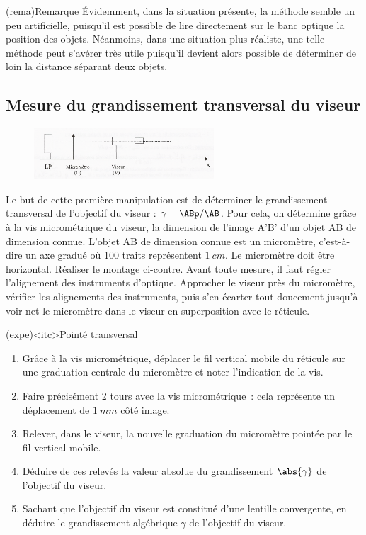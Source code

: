 \documentclass[../main/main.tex]{subfiles}
\begin{document}
\begin{tcb}[width=\linewidth](rema){Remarque} Évidemment, dans la situation
	présente, la méthode semble un peu artificielle, puisqu'il est possible de
	lire directement sur le banc optique la position des objets. Néanmoins, dans
	une situation plus réaliste, une telle méthode peut s'avérer très utile
	puisqu'il devient alors possible de déterminer de loin la distance séparant
	deux objets.
\end{tcb}

\subsection{Mesure du grandissement transversal du viseur}

\begin{figure}
	\begin{center}
		\includegraphics[width=0.6\textwidth]{PointeTransversal}
	\end{center}
\end{figure}

Le but de cette première manipulation est de déterminer le grandissement
transversal de l'objectif du viseur : $\gamma = \ABp/\AB$. Pour
cela, on détermine grâce à la vis micrométrique du viseur, la dimension de
l'image A'B' d'un objet AB de dimension connue. L'objet AB de dimension
connue est un micromètre, c'est-à-dire un axe gradué où 100 traits
représentent $\SI{1}{cm}$. Le micromètre doit être horizontal. Réaliser le
montage ci-contre. Avant toute mesure, il faut régler l'alignement des
instruments d'optique.
\bigbreak
Approcher le viseur près du micromètre, vérifier les alignements des
instruments, puis s'en écarter tout doucement jusqu'à voir net le micromètre
dans le viseur en superposition avec le réticule.

\begin{tcb}(expe)<itc>{Pointé transversal}
	\begin{enumerate}
		\item Grâce à la vis micrométrique, déplacer le fil vertical mobile du
		      réticule sur une graduation centrale du micromètre et noter
		      l'indication de la vis.
		\item Faire précisément 2 tours avec la vis micrométrique~: cela représente
		      un déplacement de $\SI{1}{mm}$ côté image.
		\item Relever, dans le viseur, la nouvelle graduation du micromètre pointée
		      par le fil vertical mobile.
		\item Déduire de ces relevés la valeur absolue du grandissement
		      $\abs{\gamma}$ de l'objectif du viseur.
		\item Sachant que l'objectif du viseur est constitué d'une lentille
		      convergente, en déduire le grandissement algébrique $\gamma$ de
		      l'objectif du viseur.
	\end{enumerate}
\end{tcb}
\end{document}
